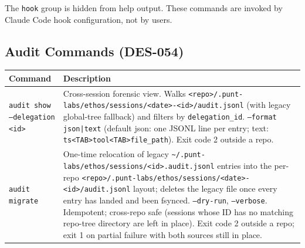 \documentclass[a4paper,10pt]{article}
\newcommand{\field}[1]{\texttt{#1}}
\newcommand{\cmd}[1]{\texttt{#1}}
\newcommand{\fpath}[1]{\texttt{#1}}
\begin{document}
The \cmd{hook} group is hidden from help output.  These commands are
invoked by Claude Code hook configuration, not by users.

\subsection{Audit Commands (DES-054)}

\begin{center}
\begin{tabular}{@{}lp{6.5cm}@{}}
\toprule
\textbf{Command} & \textbf{Description} \\
\midrule
\cmd{audit show --delegation <id>} & Cross-session forensic view.
                                     Walks
                                     \fpath{<repo>/.punt-labs/ethos/sessions/<date>-<id>/audit.jsonl}
                                     (with legacy global-tree
                                     fallback) and filters by
                                     \field{delegation\_id}.
                                     \cmd{--format json|text}
                                     (default json: one JSONL line
                                     per entry; text:
                                     \texttt{ts<TAB>tool<TAB>file\_path}).
                                     Exit code 2 outside a repo. \\
\cmd{audit migrate}                & One-time relocation of legacy
                                     \fpath{\~{}/.punt-labs/ethos/sessions/<id>.audit.jsonl}
                                     entries into the per-repo
                                     \fpath{<repo>/.punt-labs/ethos/sessions/<date>-<id>/audit.jsonl}
                                     layout; deletes the legacy
                                     file once every entry has
                                     landed and been fsynced.
                                     \cmd{--dry-run},
                                     \cmd{--verbose}.  Idempotent;
                                     cross-repo safe (sessions whose
                                     ID has no matching repo-tree
                                     directory are left in place).
                                     Exit code 2 outside a repo;
                                     exit 1 on partial failure with
                                     both sources still in place. \\
\bottomrule
\end{tabular}
\end{center}
\end{document}
